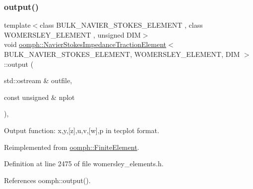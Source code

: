 \subsubsection{\texorpdfstring{output()}{output()}\hspace{0.1cm}{\footnotesize\ttfamily [2/2]}}
{\footnotesize\ttfamily template$<$class B\+U\+L\+K\+\_\+\+N\+A\+V\+I\+E\+R\+\_\+\+S\+T\+O\+K\+E\+S\+\_\+\+E\+L\+E\+M\+E\+NT , class W\+O\+M\+E\+R\+S\+L\+E\+Y\+\_\+\+E\+L\+E\+M\+E\+NT , unsigned D\+IM$>$ \\
void \hyperlink{classoomph_1_1NavierStokesImpedanceTractionElement}{oomph\+::\+Navier\+Stokes\+Impedance\+Traction\+Element}$<$ B\+U\+L\+K\+\_\+\+N\+A\+V\+I\+E\+R\+\_\+\+S\+T\+O\+K\+E\+S\+\_\+\+E\+L\+E\+M\+E\+NT, W\+O\+M\+E\+R\+S\+L\+E\+Y\+\_\+\+E\+L\+E\+M\+E\+NT, D\+IM $>$\+::output (\begin{DoxyParamCaption}\item[{std\+::ostream \&}]{outfile,  }\item[{const unsigned \&}]{nplot }\end{DoxyParamCaption})\hspace{0.3cm}{\ttfamily [inline]}, {\ttfamily [virtual]}}



Output function\+: x,y,\mbox{[}z\mbox{]},u,v,\mbox{[}w\mbox{]},p in tecplot format. 



Reimplemented from \hyperlink{classoomph_1_1FiniteElement_afa9d9b2670f999b43e6679c9dd28c457}{oomph\+::\+Finite\+Element}.



Definition at line 2475 of file womersley\+\_\+elements.\+h.



References oomph\+::output().

\mbox{\label{classoomph_1_1NavierStokesImpedanceTractionElement_abd5db43a552949e7d2ab4c1c25a68e96}} 
